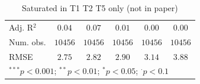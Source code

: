 \begin{table}
\begin{center}
\begin{tabular}{l c c c c c}
Adj. R$^2$                   & $0.04$         & $0.07$         & $0.01$       & $0.00$          & $0.00$      \\
Num. obs.                    & $10456$        & $10456$        & $10456$      & $10456$         & $10456$     \\
RMSE                         & $2.75$         & $2.82$         & $2.90$       & $3.14$          & $3.88$      \\
\hline
\multicolumn{6}{l}{\scriptsize{$^{***}p<0.001$; $^{**}p<0.01$; $^{*}p<0.05$; $^{\cdot}p<0.1$}}
\end{tabular}
\caption{Saturated in T1 T2 T5 only (not in paper)}
\label{table:coefficients}
\end{center}
\end{table}

